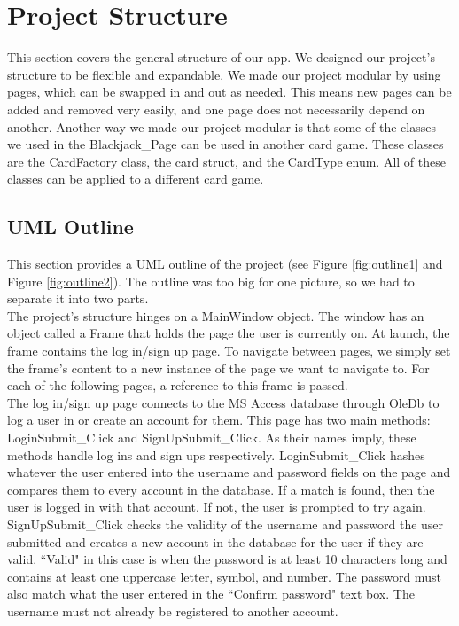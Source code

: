 \documentclass[10pt,conference,onecolumn,compsoc]{IEEEtran}
\begin{document}
\section{Project Structure}
\noindent
This section covers the general structure of our app. We designed our project's structure to be flexible and expandable. We made our project modular by using pages, which can be swapped in and out as needed. This means new pages can be added and removed very easily, and one page does not necessarily depend on another. Another way we made our project modular is that some of the classes we used in the Blackjack\_Page can be used in another card game. These classes are the CardFactory class, the card struct, and the CardType enum. All of these classes can be applied to a different card game.

\subsection{UML Outline}
\noindent
This section provides a UML outline of the project (see Figure \ref{fig:outline1} and Figure \ref{fig:outline2}). The outline was too big for one picture, so we had to separate it into two parts.\\
\newline
The project's structure hinges on a MainWindow object. The window has an object called a Frame that holds the page the user is currently on. At launch, the frame contains the log in/sign up page. To navigate between pages, we simply set the frame's content to a new instance of the page we want to navigate to. For each of the following pages, a reference to this frame is passed.\\
\newline
The log in/sign up page connects to the MS Access database through OleDb to log a user in or create an account for them. This page has two main methods: LoginSubmit\_Click and SignUpSubmit\_Click. As their names imply, these methods handle log ins and sign ups respectively.  LoginSubmit\_Click hashes whatever the user entered into the username and password fields on the page and compares them to every account in the database. If a match is found, then the user is logged in with that account. If not, the user is prompted to try again. SignUpSubmit\_Click
checks the validity of the username and password the user submitted and creates a new account in the database for the user if they are valid. ``Valid" in this case is when the password is at least 10 characters long and contains at least one uppercase letter, symbol, and number. The password must also match what the user entered in the ``Confirm password" text box. The username must not already be registered to another account.\\
\end{document}
